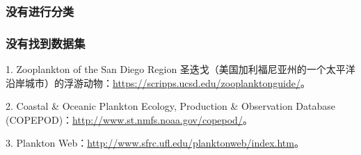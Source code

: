\subsubsection{没有进行分类}

\subsubsection{没有找到数据集}
{\color{red}1. Zooplankton of the San Diego Region 圣迭戈（美国加利福尼亚州的一个太平洋沿岸城市）的浮游动物：\url{https://scripps.ucsd.edu/zooplanktonguide/}。

2. Coastal \& Oceanic Plankton Ecology, Production \& Observation Database (COPEPOD)：\url{http://www.st.nmfs.noaa.gov/copepod/}。

3. Plankton Web：\url{http://www.sfrc.ufl.edu/planktonweb/index.htm}。
}




















